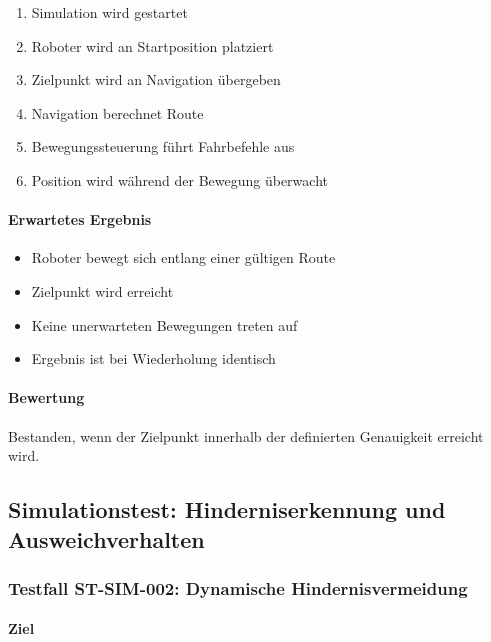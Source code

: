 \begin{enumerate}
\def\labelenumi{\arabic{enumi}.}
\tightlist
\item
  Simulation wird gestartet
\item
  Roboter wird an Startposition platziert
\item
  Zielpunkt wird an Navigation übergeben
\item
  Navigation berechnet Route
\item
  Bewegungssteuerung führt Fahrbefehle aus
\item
  Position wird während der Bewegung überwacht
\end{enumerate}

\paragraph{Erwartetes Ergebnis}\label{erwartetes-ergebnis-16}

\begin{itemize}
\tightlist
\item
  Roboter bewegt sich entlang einer gültigen Route
\item
  Zielpunkt wird erreicht
\item
  Keine unerwarteten Bewegungen treten auf
\item
  Ergebnis ist bei Wiederholung identisch
\end{itemize}

\paragraph{Bewertung}\label{bewertung-16}

Bestanden, wenn der Zielpunkt innerhalb der definierten Genauigkeit
erreicht wird.

\subsection{Simulationstest: Hinderniserkennung und
Ausweichverhalten}\label{simulationstest-hinderniserkennung-und-ausweichverhalten}

\subsubsection{Testfall ST-SIM-002: Dynamische
Hindernisvermeidung}\label{testfall-st-sim-002-dynamische-hindernisvermeidung}

\paragraph{Ziel}\label{ziel-17}

